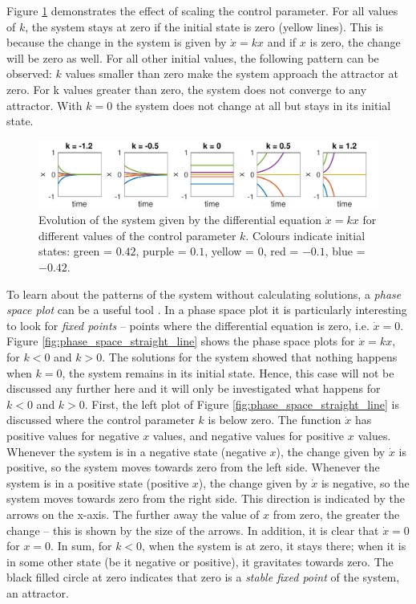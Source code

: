 Figure \ref{fig:evolution_of_straight_line2} demonstrates the effect of scaling the control parameter. For all values of $k$, the system stays at zero if the initial state is zero (yellow lines). This is because the change in the system is given by $\dot{x} = kx$ and if $x$ is zero, the change will be zero as well. For all other initial values, the following pattern can be observed: $k$ values smaller than zero make the system approach the attractor at zero. For k values greater than zero, the system does not converge to any attractor. With $k = 0$ the system does not change at all but stays in its initial state. 

\begin{figure}
\includegraphics[width=\textwidth]{figures/ch3/evolution_of_straight_line2.pdf}
\caption[Evolution of the system given by the differential equation $\dot{x} = kx$ for different values of the control parameter $k$.]{Evolution of the system given by the differential equation $\dot{x} = kx$ for different values of the control parameter $k$. Colours indicate initial states: green = $0.42$, purple = $0.1$, yellow = $0$, red = $-0.1$, blue = $-0.42$.}
\label{fig:evolution_of_straight_line2}
\end{figure}

To learn about the patterns of the system without calculating solutions, a \emph{phase space plot} can be a useful tool \citep{Fuchs2013}. In a phase space plot it is particularly interesting to look for \emph{fixed points} -- points where the differential equation is zero, i.e. $\dot{x} = 0$. Figure \ref{fig:phase_space_straight_line} shows the phase space plots for $\dot{x} = kx$, for $k<0$ and $k>0$. The solutions for the system showed that nothing happens when $k = 0$, the system remains in its initial state. Hence, this case will not be discussed any further here and it will only be investigated what happens for $k < 0$ and $k > 0$. First, the left plot of Figure \ref{fig:phase_space_straight_line} is discussed where the control parameter $k$ is below zero. The function $\dot{x}$ has positive values for negative $x$ values, and negative values for positive $x$ values. Whenever the system is in a negative state (negative $x$), the change given by $\dot{x}$ is positive, so the system moves towards zero from the left side. Whenever the system is in a positive state (positive $x$), the change given by $\dot{x}$ is negative, so the system moves towards zero from the right side. This direction is indicated by the arrows on the x-axis. The further away the value of $x$ from zero, the greater the change -- this is shown by the size of the arrows. In addition, it is clear that $\dot{x} = 0$ for $x=0$. In sum, for $k<0$, when the system is at zero, it stays there; when it is in some other state (be it negative or positive), it gravitates towards zero. The black filled circle at zero indicates that zero is a \emph{stable fixed point} of the system, an attractor. 

